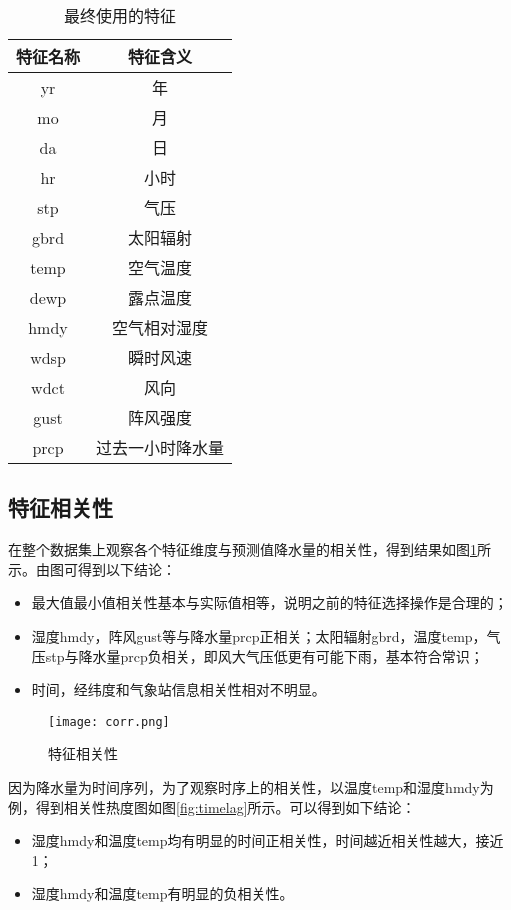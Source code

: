 \documentclass[UTF8]{ctexart}
\begin{document}
\begin{table}[htb]
  \centering
  \begin{minipage}[t]{0.4\linewidth}
  \caption{最终使用的特征}
  \label{tab:特征}
    \begin{tabular}{cc}
      \toprule[1.5pt]
      特征名称& {特征含义} \\
      \midrule[1pt]
      {yr} & 年 \\
      {mo} & 月  \\
      {da} & 日 \\
      {hr} & 小时  \\
      {stp} & 气压 \\
      {gbrd} & 太阳辐射 \\
      {temp} & 空气温度 \\
      {dewp} & 露点温度 \\
      {hmdy} & 空气相对湿度 \\
      {wdsp} & 瞬时风速 \\
      {wdct} & 风向 \\
      {gust} & 阵风强度 \\
      {prcp} & 过去一小时降水量 \\
      \bottomrule[1.5pt]
    \end{tabular}
  \end{minipage}
\end{table}

\subsection{特征相关性}
在整个数据集上观察各个特征维度与预测值降水量的相关性，得到结果如图\ref{fig:corr}所示。由图可得到以下结论：
\begin{itemize}
	\item 最大值最小值相关性基本与实际值相等，说明之前的特征选择操作是合理的；
	\item 湿度hmdy，阵风gust等与降水量prcp正相关；太阳辐射gbrd，温度temp，气压stp与降水量prcp负相关，即风大气压低更有可能下雨，基本符合常识；
	\item 时间，经纬度和气象站信息相关性相对不明显。
\end{itemize}


\begin{figure}[h] %
  \centering
  \texttt{[image: corr.png]}
  \caption{特征相关性}
  \label{fig:corr}
\end{figure}

因为降水量为时间序列，为了观察时序上的相关性，以温度temp和湿度hmdy为例，得到相关性热度图如图\ref{fig:timelag}所示。可以得到如下结论：
\begin{itemize}
	\item 湿度hmdy和温度temp均有明显的时间正相关性，时间越近相关性越大，接近1；
	\item 湿度hmdy和温度temp有明显的负相关性。
\end{itemize}
\end{document}
